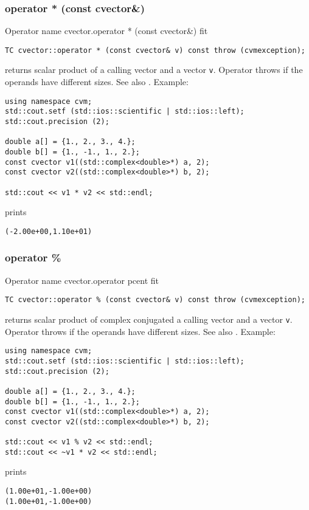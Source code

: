 \subsubsection{operator * (const cvector\&)}
Operator%
\pdfdest name {cvector.operator * (const cvector&)} fit
\begin{verbatim}
TC cvector::operator * (const cvector& v) const throw (cvmexception);
\end{verbatim}
returns  scalar product of a calling vector and a vector \verb"v".
Operator throws 
if the operands have different sizes.
See also .
Example:
\begin{Verbatim}
using namespace cvm;
std::cout.setf (std::ios::scientific | std::ios::left);
std::cout.precision (2);

double a[] = {1., 2., 3., 4.};
double b[] = {1., -1., 1., 2.};
const cvector v1((std::complex<double>*) a, 2);
const cvector v2((std::complex<double>*) b, 2);

std::cout << v1 * v2 << std::endl;
\end{Verbatim}
prints
\begin{Verbatim}
(-2.00e+00,1.10e+01)
\end{Verbatim}
\newpage



\subsubsection{operator \%}
Operator%
\pdfdest name {cvector.operator pcent} fit
\begin{verbatim}
TC cvector::operator % (const cvector& v) const throw (cvmexception);
\end{verbatim}
returns  scalar product of  complex conjugated
a calling  vector and a vector \verb"v".
Operator throws 
if the operands have different sizes.
See also .
Example:
\begin{Verbatim}
using namespace cvm;
std::cout.setf (std::ios::scientific | std::ios::left);
std::cout.precision (2);

double a[] = {1., 2., 3., 4.};
double b[] = {1., -1., 1., 2.};
const cvector v1((std::complex<double>*) a, 2);
const cvector v2((std::complex<double>*) b, 2);

std::cout << v1 % v2 << std::endl;
std::cout << ~v1 * v2 << std::endl;
\end{Verbatim}
prints
\begin{Verbatim}
(1.00e+01,-1.00e+00)
(1.00e+01,-1.00e+00)
\end{Verbatim}
\newpage



